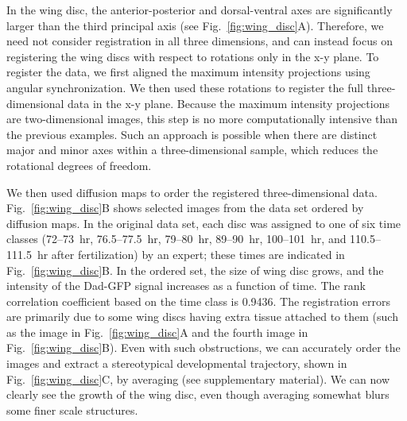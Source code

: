 \documentclass[twocolumn, 10pt]{article}
\newcommand{\SI}[0]{supplementary material}
\newcommand{\fig}[0]{Fig.}
\begin{document}
In the wing disc, the anterior-posterior and dorsal-ventral axes are significantly larger than the third principal axis (see \fig~\ref{fig:wing_disc}A). 
%
Therefore, we need not consider registration in all three dimensions, and can instead focus on registering the wing discs with respect to rotations only in the x-y plane.
%
To register the data, we first aligned the maximum intensity projections using angular synchronization.
%
We then used these rotations to register the full three-dimensional data in the x-y plane.
%
Because the maximum intensity projections are two-dimensional images, this step is no more computationally intensive than the previous examples.
%
Such an approach is possible when there are distinct major and minor axes within a three-dimensional sample, which reduces the rotational degrees of freedom.
%

We then used diffusion maps to order the registered three-dimensional data.
%
\fig~\ref{fig:wing_disc}B shows selected images from the data set ordered by diffusion maps.
%
In the original data set, each disc was assigned to one of six time classes (72--73~hr, 76.5--77.5~hr, 79--80~hr, 89--90~hr, 100--101~hr, and 110.5--111.5~hr after fertilization) by an expert; these times are indicated in \fig~\ref{fig:wing_disc}B.
%
In the ordered set, the size of wing disc grows, and the intensity of the Dad-GFP signal increases as a function of time.
%
The rank correlation coefficient based on the time class is 0.9436.
%
The registration errors are primarily due to some wing discs having extra tissue attached to them (such as the image in \fig~\ref{fig:wing_disc}A and the fourth image in \fig~\ref{fig:wing_disc}B).
%
Even with such obstructions, we can accurately order the images and extract a stereotypical developmental trajectory, shown in \fig~\ref{fig:wing_disc}C, by averaging (see \SI).
%
We can now clearly see the growth of the wing disc, even though averaging somewhat blurs some finer scale structures.
%

%
%
%
\end{document}
